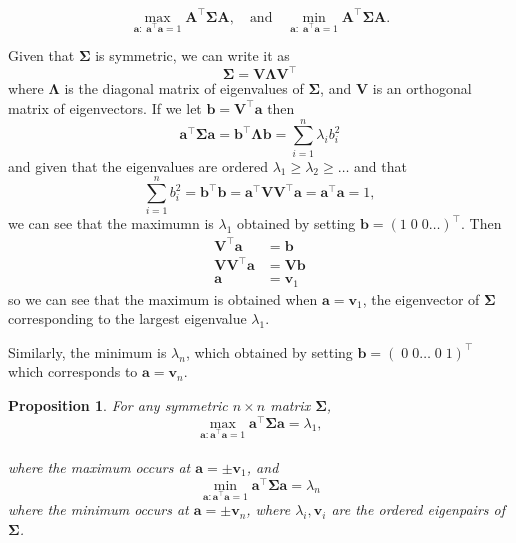 \documentclass[
]{book}
\newtheorem{proposition}{Proposition}[chapter]
\theoremstyle{definition}
\theoremstyle{definition}
\theoremstyle{definition}
\theoremstyle{definition}
\theoremstyle{remark}
\begin{document}
\begin{equation}
\max_{\mathbf a: \;\mathbf a^\top \mathbf a=1}\mathbf A^\top \boldsymbol{\Sigma}\mathbf A, \quad \mbox{and}\quad
\min_{\mathbf a: \;\mathbf a^\top \mathbf a=1}\mathbf A^\top \boldsymbol{\Sigma}\mathbf A.
\label{eq:eigenopt}
\end{equation}

Given that \(\boldsymbol{\Sigma}\) is symmetric, we can write it as
\[\boldsymbol{\Sigma}= \mathbf V\boldsymbol \Lambda\mathbf V^\top \]
where \(\boldsymbol \Lambda\) is the diagonal matrix of eigenvalues of \(\boldsymbol{\Sigma}\), and \(\mathbf V\) is an orthogonal matrix of eigenvectors. If we let \(\mathbf b=\mathbf V^\top \mathbf a\) then
\[\mathbf a^\top \boldsymbol{\Sigma}\mathbf a= \mathbf b^\top \boldsymbol \Lambda\mathbf b= \sum_{i=1}^n \lambda_i b_i^2\]
and given that the eigenvalues are ordered \(\lambda_1\geq \lambda_2 \geq \ldots\) and that \[\sum_{i=1}^n b_i^2=\mathbf b^\top\mathbf b=\mathbf a^\top \mathbf V\mathbf V^\top\mathbf a=\mathbf a^\top\mathbf a=1,\]
we can see that the maximumn is \(\lambda_1\) obtained by setting \(\mathbf b=(1\;0\;0 \ldots)^\top\). Then
\begin{align*}
\mathbf V^\top \mathbf a&= \mathbf b\\
\mathbf V\mathbf V^\top \mathbf a&=\mathbf V\mathbf b\\
\mathbf a&= \mathbf v_1
\end{align*}
so we can see that the maximum is obtained when \(\mathbf a=\mathbf v_1\), the eigenvector of \(\boldsymbol{\Sigma}\) corresponding to the largest eigenvalue \(\lambda_1\).

Similarly, the minimum is \(\lambda_n\), which obtained by setting \(\mathbf b=(\;0\;0 \ldots\;0\;1)^\top\) which corresponds to \(\mathbf a=\mathbf v_n\).

\begin{proposition}
\protect\hypertarget{prp:two8}{}{\label{prp:two8} }For any symmetric \(n \times n\) matrix \(\boldsymbol{\Sigma}\),
\[\max_{\mathbf a: \mathbf a^\top \mathbf a=1} \mathbf a^\top\boldsymbol{\Sigma}\mathbf a=\lambda_1,\]\\
where the maximum occurs at \(\mathbf a=\pm \mathbf v_1\), and
\[\min_{\mathbf a: \mathbf a^\top \mathbf a=1} \mathbf a^\top\boldsymbol{\Sigma}\mathbf a=\lambda_n\]
where the minimum occurs at \(\mathbf a= \pm \mathbf v_n\), where \(\lambda_i, \mathbf v_i\) are the ordered eigenpairs of \(\boldsymbol{\Sigma}\).
\end{proposition}
\end{document}
